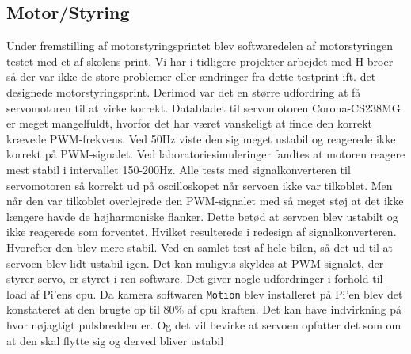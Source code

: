 \subsection{Motor/Styring} \label{sec:hwi_motor_styring}
Under fremstilling af motorstyringsprintet blev softwaredelen af motorstyringen testet med et af skolens print. 
Vi har i tidligere projekter arbejdet med H-broer så der var ikke de store problemer eller ændringer fra dette testprint ift. det designede motorstyringsprint.
Derimod var det en større udfordring at få servomotoren til at virke korrekt.  
Databladet til servomotoren Corona-CS238MG \cite{lib:Corona-CS238MG} er meget mangelfuldt, hvorfor det har været vanskeligt at finde den korrekt krævede PWM-frekvens. 
Ved 50Hz viste den sig meget ustabil og reagerede ikke korrekt på PWM-signalet. 
Ved laboratoriesimuleringer fandtes at motoren reagere mest stabil i intervallet 150-200Hz. 
Alle tests med signalkonverteren til servomotoren så korrekt ud på oscilloskopet når servoen ikke var tilkoblet. 
Men når den var tilkoblet overlejrede den PWM-signalet med så meget støj at det ikke længere havde de højharmoniske flanker. Dette betød at servoen blev ustabilt og ikke reagerede som forventet. Hvilket resulterede i redesign af signalkonverteren. Hvorefter den blev mere stabil.
Ved en samlet test af hele bilen, så det ud til at servoen blev lidt ustabil igen. 
Det kan muligvis skyldes at PWM signalet, der styrer servo, er styret i ren software. 
Det giver nogle udfordringer i forhold til load af Pi'ens cpu. Da kamera softwaren \texttt{Motion} blev installeret på Pi'en blev det konstateret at den brugte op til 80\% af cpu kraften. Det kan have indvirkning på hvor nøjagtigt pulsbredden er. Og det vil bevirke at servoen opfatter det som om at den skal flytte sig og derved bliver ustabil

